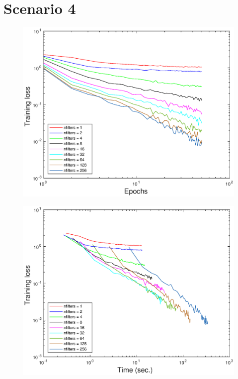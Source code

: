 \documentclass{article}
\begin{document}
    
    
    
\section*{Scenario 4}
	\begin{figure}[!htb]
        \centering
        \includegraphics[width=\textwidth]{figures/sc4_tr_loss}
    \end{figure}
    \begin{figure}[!htb]
        \centering
        \includegraphics[width=\textwidth]{figures/sc4_tr_loss_time}
    \end{figure}
\end{document}
